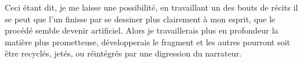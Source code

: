 Ceci étant dit, je me laisse une possibilité, en travaillant un des bouts de
récits il se peut que l'un finisse par se dessiner plus clairement à mon
esprit, que le procédé semble devenir artificiel. Alors je travaillerais plus
en profondeur la matière plus prometteuse, développerais le fragment et les
autres pourront soit être recyclés, jetés, ou réintégrés par une digression du
narrateur.\\ 


